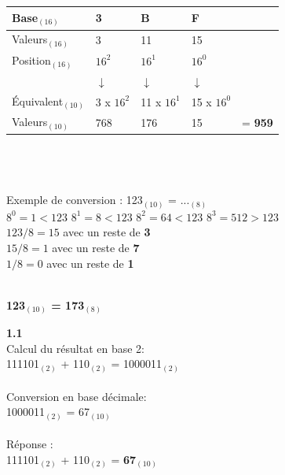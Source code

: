 \begin{Exercice}[20 minutes]
\begin{conseil}
    \begin{tabular}{| C{0.15\textwidth} | C{0.15\textwidth} | C{0.15\textwidth} | C{0.15\textwidth} | C{0.1\textwidth} |} 
            \hline
            Base$_{(16)}$ & \textbf{3} & \textbf{B} & \textbf{F} & \textbf{}\\ [0.5ex]
            \hline
             Valeurs$_{(16)}$ & 3 & 11 & 15 & \\ [0.5ex]
             \hline
             Position$_{(16)}$ & $16^2$ & $16^1$ & $16^0$ & \\ [0.5ex] 
            \hline
             & $\downarrow$ & $\downarrow$ & $\downarrow$ & \\ [0.5ex] 
            \hline
            Équivalent$_{(10)}$ & 3 x $16^2$ & 11 x $16^1$ & 15 x $16^0$ &\\ [0.5ex]     
            \hline
            Valeurs$_{(10)}$ & 768 & 176 & 15 & = \textbf{959} \\ [0.5ex]
            \hline
    \end{tabular}
\\\\\\
    Exemple de conversion : 123$_{(10)}$ = ...$_{(8)}$\\
        
        $8^0 = 1 < 123$\qquad
        $8^1 = 8 < 123$\qquad
        $8^2 = 64 < 123$\qquad
        $8^3 = 512 > 123$\\
        
        $123 / 8 = 15$ avec un reste de \textbf{3}\\
        $15 / 8 = 1$ avec un reste de \textbf{7}\\
        $1 / 8 = 0$ avec un reste de \textbf{1}\\\
        
        \textbf{123$_{(10)}$ = 173$_{(8)}$}\\


    \end{conseil}
    \begin{solution}
        \textbf{1.1}\\
        Calcul du résultat en base 2:\\
        111101$_{(2)}$ + 110$_{(2)}$ = 1000011$_{(2)}$\\\\
        Conversion en base décimale:\\
        1000011$_{(2)}$ = 67$_{(10)}$\\\\
        Réponse :\\
        111101$_{(2)}$ + 110$_{(2)}$ = \textbf{67$_{(10)}$}\\
        

\end{solution}
\end{Exercice}
